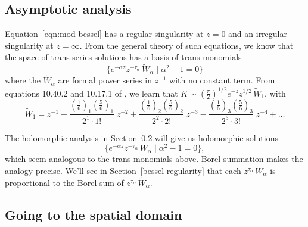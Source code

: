 \documentclass{article}
\theoremstyle{plain}
\newcommand{\series}[1]{\tilde{#1}}
\begin{document}
\subsection{Asymptotic analysis}
Equation~\ref{eqn:mod-bessel} has a regular singularity at $z = 0$ and an irregular singularity at $z = \infty$. From the general theory of such equations, we know that the space of trans-series solutions has a basis of trans-monomials
\[ \{ e^{-\alpha z} z^{-\tau_\alpha}\,\series{W}_\alpha \mid \alpha^2 - 1 = 0 \} \]
where the $\series{W}_\alpha$ are formal power series in $z^{-1}$ with no constant term. From equations 10.40.2 and 10.17.1 of \cite{dlmf}, we learn that $K \sim \left(\tfrac{\pi}{2}\right)^{1/2} e^{-z} z^{1/2}\,\series{W}_1$, with
\begin{equation}\label{bessel-asymp}
\series{W}_1 = z^{-1} - \frac{(\tfrac{1}{6})_1 (\tfrac{5}{6})_1}{2^1 \cdot 1!}\;z^{-2} + \frac{(\tfrac{1}{6})_2 (\tfrac{5}{6})_2}{2^2 \cdot 2!}\;z^{-3} - \frac{(\tfrac{1}{6})_3 (\tfrac{5}{6})_3}{2^3 \cdot 3!}\;z^{-4} + \ldots
\end{equation}

The holomorphic analysis in Section~\ref{spatial} will give us holomorphic solutions
\[ \{ e^{-\alpha z} z^{-\tau_\alpha}\,W_\alpha \mid \alpha^2 - 1 = 0 \}, \]
which seem analogous to the trans-monomials above. Borel summation makes the analogy precise. We'll see in Section~\ref{bessel-regularity} that each $z^{\tau_\alpha}\,W_\alpha$ is proportional to the Borel sum of $z^{\tau_\alpha}\,\series{W}_\alpha$.
\subsection{Going to the spatial domain}\label{spatial}
\color{violet}
\end{document}
